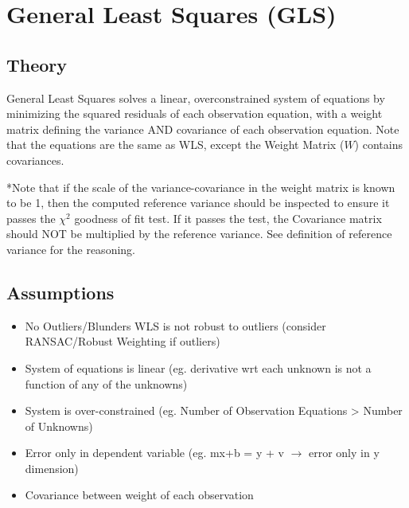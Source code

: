 \section{General Least Squares (GLS)}
\subsection{Theory}
General Least Squares solves a linear, overconstrained system of equations by minimizing the squared residuals of each observation equation, with a weight matrix defining the variance AND covariance of each observation equation.  Note that the equations are the same as WLS, except the Weight Matrix ($W$) contains covariances.

*Note that if the scale of the variance-covariance in the weight matrix is known to be 1, then the computed reference variance should be inspected to ensure it passes the $\chi^2$ goodness of fit test.  If it passes the test, the Covariance matrix should NOT be multiplied by the reference variance.  See definition of reference variance for the reasoning.

\subsection{Assumptions}
\begin{itemize}
	\item No Outliers/Blunders WLS is not robust to outliers (consider RANSAC/Robust Weighting if outliers)
	\item System of equations is linear (eg. derivative wrt each unknown is not a function of any of the unknowns)
	\item System is over-constrained (eg. Number of Observation Equations > Number of Unknowns)
	\item Error only in dependent variable (eg. mx+b = y + v $\rightarrow$ error only in y dimension)
	\item Covariance between weight of each observation
\end{itemize}
